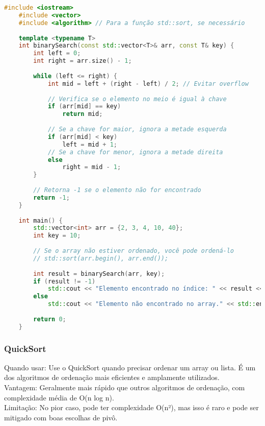 \documentclass{article}
\begin{document}
\begin{lstlisting}[language=C++, caption=binary search]
    #include <iostream>
    #include <vector>
    #include <algorithm> // Para a função std::sort, se necessário
    
    template <typename T>
    int binarySearch(const std::vector<T>& arr, const T& key) {
        int left = 0;
        int right = arr.size() - 1;
        
        while (left <= right) {
            int mid = left + (right - left) / 2; // Evitar overflow
    
            // Verifica se o elemento no meio é igual à chave
            if (arr[mid] == key)
                return mid;
    
            // Se a chave for maior, ignora a metade esquerda
            if (arr[mid] < key)
                left = mid + 1;
            // Se a chave for menor, ignora a metade direita
            else
                right = mid - 1;
        }
    
        // Retorna -1 se o elemento não for encontrado
        return -1;
    }
    
    int main() {
        std::vector<int> arr = {2, 3, 4, 10, 40};
        int key = 10;
    
        // Se o array não estiver ordenado, você pode ordená-lo
        // std::sort(arr.begin(), arr.end());
    
        int result = binarySearch(arr, key);
        if (result != -1)
            std::cout << "Elemento encontrado no índice: " << result << std::endl;
        else
            std::cout << "Elemento não encontrado no array." << std::endl;
    
        return 0;
    }
\end{lstlisting}

\subsubsection{QuickSort}

Quando usar: Use o QuickSort quando precisar ordenar um array ou lista. É um dos algoritmos de ordenação mais eficientes e amplamente utilizados.
\\Vantagem: Geralmente mais rápido que outros algoritmos de ordenação, com complexidade média de O(n log n).
\\Limitação: No pior caso, pode ter complexidade O(n²), mas isso é raro e pode ser mitigado com boas escolhas de pivô.
\end{document}
